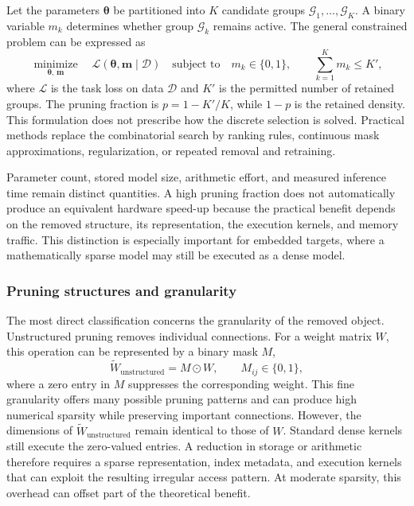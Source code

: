 \documentclass[
    a4paper,
    12pt,
    titlepage,
    bibliography=totoc,
    twoside=on,
    parskip=false,
    numbers=noenddot,
    cleardoublepage=empty,
    DIV=12,
    BCOR=12.0mm,
    headheight=36pt,
    headings=openright
]{scrreprt}
\begin{document}
Let the parameters $\boldsymbol{\theta}$ be partitioned into $K$ candidate groups $\mathcal G_1,\ldots,\mathcal G_K$. A binary variable $m_k$ determines whether group $\mathcal G_k$ remains active. The general constrained problem can be expressed as
\begin{equation}
    \underset{\boldsymbol{\theta},\,\boldsymbol{m}}{\operatorname{minimize}}
    \quad
    \mathcal L\!\left(\boldsymbol{\theta},\boldsymbol{m}\mid\mathcal D\right)
    \quad
    \text{subject to}
    \quad
    m_k\in\{0,1\},
    \qquad
    \sum_{k=1}^{K}m_k\leq K',
    \label{eq:fundamental_pruning_problem}
\end{equation}
where $\mathcal L$ is the task loss on data $\mathcal D$ and $K'$ is the permitted number of retained groups. The pruning fraction is $p=1-K'/K$, while $1-p$ is the retained density. This formulation does not prescribe how the discrete selection is solved. Practical methods replace the combinatorial search by ranking rules, continuous mask approximations, regularization, or repeated removal and retraining.

Parameter count, stored model size, arithmetic effort, and measured inference time remain distinct quantities. A high pruning fraction does not automatically produce an equivalent hardware speed-up because the practical benefit depends on the removed structure, its representation, the execution kernels, and memory traffic. This distinction is especially important for embedded targets, where a mathematically sparse model may still be executed as a dense model.

\subsubsection{Pruning structures and granularity}

The most direct classification concerns the granularity of the removed object. Unstructured pruning removes individual connections. For a weight matrix $W$, this operation can be represented by a binary mask $M$,
\begin{equation}
    \widetilde W_{\mathrm{unstructured}}=M\odot W,
    \qquad M_{ij}\in\{0,1\},
    \label{eq:fundamental_unstructured_pruning}
\end{equation}
where a zero entry in $M$ suppresses the corresponding weight. This fine granularity offers many possible pruning patterns and can produce high numerical sparsity while preserving important connections. However, the dimensions of $\widetilde W_{\mathrm{unstructured}}$ remain identical to those of $W$. Standard dense kernels still execute the zero-valued entries. A reduction in storage or arithmetic therefore requires a sparse representation, index metadata, and execution kernels that can exploit the resulting irregular access pattern. At moderate sparsity, this overhead can offset part of the theoretical benefit.\autocite{hanLearningBothWeights2015,blalockWhatStateNeural2020,chengSurveyDeepNeural2024}
\end{document}
